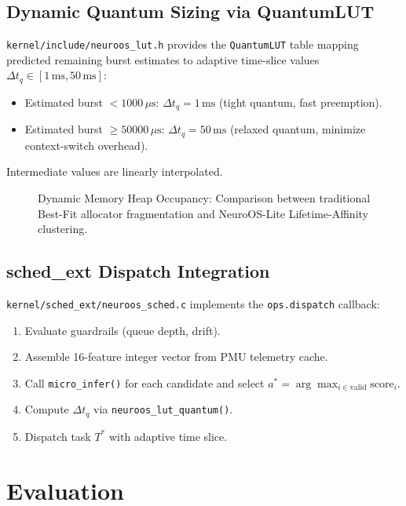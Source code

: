 \subsection{Dynamic Quantum Sizing via QuantumLUT}
\label{subsec:lut}

\texttt{kernel/include/neuroos\_lut.h} provides the \texttt{QuantumLUT} table
mapping predicted remaining burst estimates to adaptive time-slice values
$\Delta t_q \in [1\,\text{ms}, 50\,\text{ms}]$:
\begin{itemize}
  \item Estimated burst $<1000\,\mu\text{s}$: $\Delta t_q = 1\,\text{ms}$ (tight quantum, fast preemption).
  \item Estimated burst $\ge 50000\,\mu\text{s}$: $\Delta t_q = 50\,\text{ms}$ (relaxed quantum, minimize context-switch overhead).
\end{itemize}
Intermediate values are linearly interpolated.

\begin{figure}[t]
  \centering
  \caption{Dynamic Memory Heap Occupancy: Comparison between traditional Best-Fit allocator fragmentation and NeuroOS-Lite Lifetime-Affinity clustering.}
  \label{fig:memory_heatmap}
\end{figure}

\subsection{sched\_ext Dispatch Integration}
\label{subsec:schedext}

\texttt{kernel/sched\_ext/neuroos\_sched.c} implements the \texttt{ops.dispatch}
callback:
\begin{enumerate}
  \item Evaluate guardrails (queue depth, drift).
  \item Assemble 16-feature integer vector from PMU telemetry cache.
  \item Call \texttt{micro\_infer()} for each candidate and select
    $a^* = \arg\max_{i \in \text{valid}} \text{score}_i$.
  \item Compute $\Delta t_q$ via \texttt{neuroos\_lut\_quantum()}.
  \item Dispatch task $T^*$ with adaptive time slice.
\end{enumerate}

\section{Evaluation}
\label{sec:eval}

